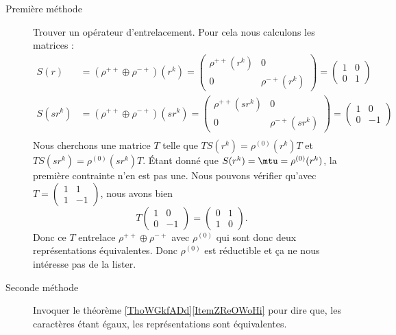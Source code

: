 \begin{enumerate}
\begin{description}
            \item[Première méthode]
                Trouver un opérateur d'entrelacement. Pour cela nous calculons les matrices :
        \begin{subequations}
            \begin{align}
                S(r)&=(\rho^{++}\oplus \rho^{-+})(r^k)=\begin{pmatrix}
                    \rho^{++}(r^k)    &   0    \\ 
                    0  &   \rho^{-+}(r^k)    
                \end{pmatrix}=\begin{pmatrix}
                    1    &   0    \\ 
                    0    &   1    
                \end{pmatrix}\\
                S(sr^k)&=(\rho^{++}\oplus \rho^{-+})(sr^k)=\begin{pmatrix}
                    \rho^{++}(sr^k)    &   0    \\ 
                    0  &   \rho^{-+}(sr^k)    
                \end{pmatrix}=\begin{pmatrix}
                    1    &   0    \\ 
                    0    &   -1    
                \end{pmatrix}\\
            \end{align}
        \end{subequations}
        Nous cherchons une matrice \( T\) telle que \( TS(r^k)=\rho^{(0)}(r^k)T\) et \( TS(sr^k)=\rho^{(0)}(sr^k)T\). Étant donné que \( S(r^k)=\mtu=\rho^{(0)}(r^k)\), la première contrainte n'en est pas une. Nous pouvons vérifier qu'avec \( T=\begin{pmatrix}
            1    &   1    \\ 
            1    &   -1    
        \end{pmatrix}\), nous avons bien
        \begin{equation}
            T\begin{pmatrix}
                1    &   0    \\ 
                0    &   -1    
            \end{pmatrix}=\begin{pmatrix}
                0    &   1    \\ 
                1    &   0    
            \end{pmatrix}.
        \end{equation}
        Donc ce \( T\) entrelace \( \rho^{++}\oplus \rho^{-+}\) avec \( \rho^{(0)}\) qui sont donc deux représentations équivalentes. Donc \( \rho^{(0)}\) est réductible et ça ne nous intéresse pas de la lister.
            \item[Seconde méthode] 
                Invoquer le théorème \ref{ThoWGkfADd}\ref{ItemZReOWoHi} pour dire que, les caractères étant égaux, les représentations sont équivalentes.


\end{description}
\end{enumerate}
